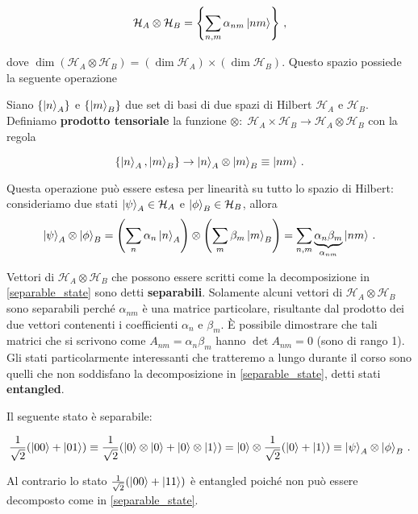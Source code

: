 \begin{equation*}
    \mathcal{H}_A \otimes \mathcal{H}_B = \left\lbrace \sum_{n,m} \alpha_{nm} \ket{nm} \right\rbrace \, ,
\end{equation*}

\noindent dove $\dim (\mathcal{H}_A \otimes \mathcal{H}_B) = (\dim \mathcal{H}_A) \times (\dim \mathcal{H}_B)$. Questo spazio possiede la seguente operazione

\begin{definizione}
    Siano $\lbrace \ket{n}_A \rbrace$ e $\lbrace \ket{m}_B \rbrace$ due set di basi di due spazi di Hilbert $\mathcal{H}_A$ e $\mathcal{H}_B$. Definiamo \textbf{prodotto tensoriale} la funzione $\otimes: \; \mathcal{H}_A \times \mathcal{H}_B \rightarrow \mathcal{H}_A \otimes \mathcal{H}_B$ con la regola
    
    \begin{equation*}
        \lbrace \ket{n}_A, \ket{m}_B \rbrace \rightarrow \ket{n}_A \otimes \ket{m}_B \equiv \ket{nm} \, .     
    \end{equation*}
\end{definizione}

\noindent Questa operazione può essere estesa per linearità su tutto lo spazio di Hilbert: consideriamo due stati $\ket{\psi}_A \in \mathcal{H}_A$ e $\ket{\phi}_B \in \mathcal{H}_B$, allora
\begin{equation}\label{separable_state}
    \ket{\psi}_A \otimes \ket{\phi}_B = \left( \sum_n \alpha_n \ket{n}_A \right) \otimes \left( \sum_m \beta_m \ket{m}_B \right) = \sum_{n,m} \underbrace{\alpha_n \beta_m}_{\alpha_{nm}} \ket{nm} \, .
\end{equation}

\noindent Vettori di $\mathcal{H}_A \otimes \mathcal{H}_B$ che possono essere scritti come la decomposizione in \eqref{separable_state} sono detti \textbf{separabili}. Solamente alcuni vettori di $\mathcal{H}_A \otimes \mathcal{H}_B$ sono separabili perché $\alpha_{nm}$ è una matrice particolare, risultante dal prodotto dei due vettori contenenti i coefficienti $\alpha_n$ e $\beta_m$. È possibile dimostrare che tali matrici che si scrivono come $A_{nm} = \alpha_n \beta_m$ hanno $\det A_{nm} = 0$ (sono di rango 1). Gli stati particolarmente interessanti che tratteremo a lungo durante il corso sono quelli che non soddisfano la decomposizione in \eqref{separable_state}, detti stati \textbf{entangled}. 

\begin{esempio}
    Il seguente stato è separabile:
    
    \begin{equation*}
        \frac{1}{\sqrt{2}} (\ket{00} + \ket{01}) \equiv \frac{1}{\sqrt{2}} (\ket{0} \otimes \ket{0} + \ket{0} \otimes \ket{1}) = \ket{0} \otimes \frac{1}{\sqrt{2}} (\ket{0} + \ket{1}) \equiv \ket{\psi}_A \otimes \ket{\phi}_B \, .
    \end{equation*}
    
    \noindent Al contrario lo stato $\frac{1}{\sqrt{2}} (\ket{00} + \ket{11})$ è entangled poiché non può essere decomposto come in \eqref{separable_state}. 
\end{esempio}

